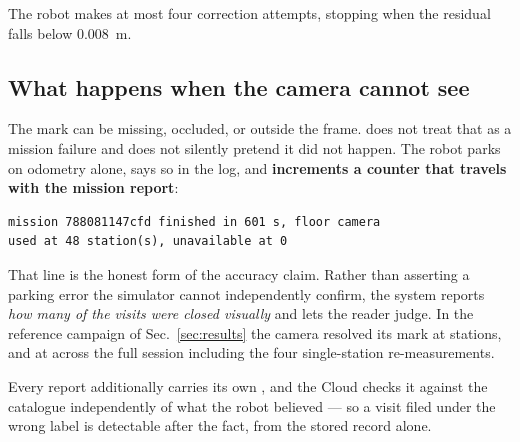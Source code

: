 The robot makes at most four correction attempts, stopping when the
residual falls below \SI{0.008}{m}.

\subsection{What happens when the camera cannot see}

The mark can be missing, occluded, or outside the frame. \phaseC{} does
not treat that as a mission failure and does not silently pretend it
did not happen. The robot parks on odometry alone, says so in the log,
and \textbf{increments a counter that travels with the mission report}:

\begin{lstlisting}[style=bash]
mission 788081147cfd finished in 601 s, floor camera
used at 48 station(s), unavailable at 0
\end{lstlisting}

That line is the honest form of the accuracy claim. Rather than
asserting a parking error the simulator cannot independently confirm,
the system reports \emph{how many of the visits were closed visually}
and lets the reader judge. In the reference campaign of
Sec.~\ref{sec:results} the camera resolved its mark at
 stations, and at  across the full
session including the four single-station re-measurements.

Every report additionally carries its own , and
the Cloud checks it against the catalogue independently of what the
robot believed --- so a visit filed under the wrong label is detectable
after the fact, from the stored record alone.
